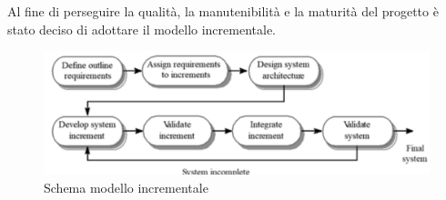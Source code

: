 Al fine di perseguire la qualità, la {manutenibilità} e la maturità del progetto
è stato deciso di adottare il {modello incrementale}.
\begin{figure}[H]
\centering
\includegraphics[scale=0.4]{Modelli_di_Sviluppo/mod_inc1.png}
\caption{Schema modello incrementale}
\end{figure}
